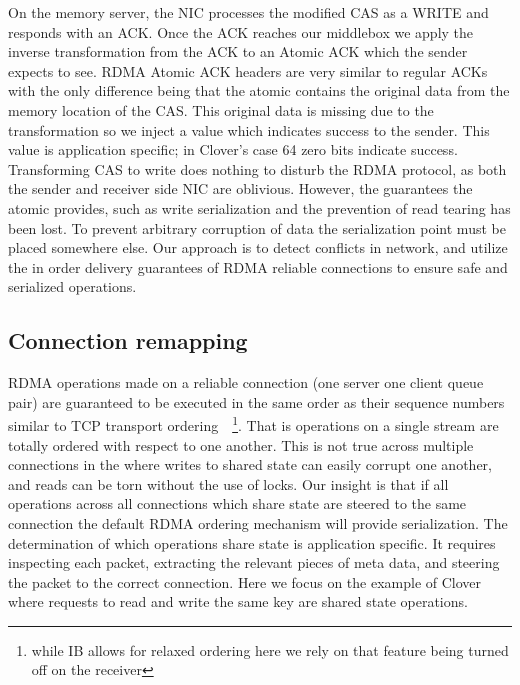 On the memory server, the NIC processes the modified CAS as a WRITE and responds
with an ACK. Once the ACK reaches our middlebox we apply the inverse
transformation from the ACK to an Atomic ACK which the sender expects to see.
RDMA Atomic ACK headers are very similar to regular ACKs with the only
difference being that the atomic contains the original data from the memory
location of the CAS. This original data is missing due to the transformation so
we inject a value which indicates success to the sender.
This value is application specific; in Clover's case 64 zero bits indicate
success. Transforming CAS to write does nothing to disturb the RDMA protocol, as
both the sender and receiver side NIC are oblivious.  However, the guarantees
the atomic provides, such as write serialization and the prevention of read
tearing has been lost. To prevent arbitrary corruption of data the serialization
point must be placed somewhere else. Our approach is to detect conflicts in
network, and utilize the in order delivery guarantees of RDMA reliable
connections to ensure safe and serialized operations.

\subsection{Connection remapping}

RDMA operations made on a reliable connection (one server one client queue pair)
are guaranteed to be executed in the same order as their sequence numbers
similar to TCP transport ordering~\cite{infiniband-spec}~\footnote{while IB
allows for relaxed ordering here we rely on that feature being turned off on the
receiver}. That is operations on a single stream are totally ordered with
respect to one another. This is not true across multiple connections in the
where writes to shared state can easily corrupt one another, and reads can be
torn without the use of locks.  Our insight is that if all operations across all
connections which share state are steered to the same connection the default
RDMA ordering mechanism will provide serialization.  The determination of which
operations share state is application specific. It requires inspecting each
packet, extracting the relevant pieces of meta data, and steering the packet to
the correct connection. Here we focus on the example of Clover where requests to
read and write the same key are shared state operations.


